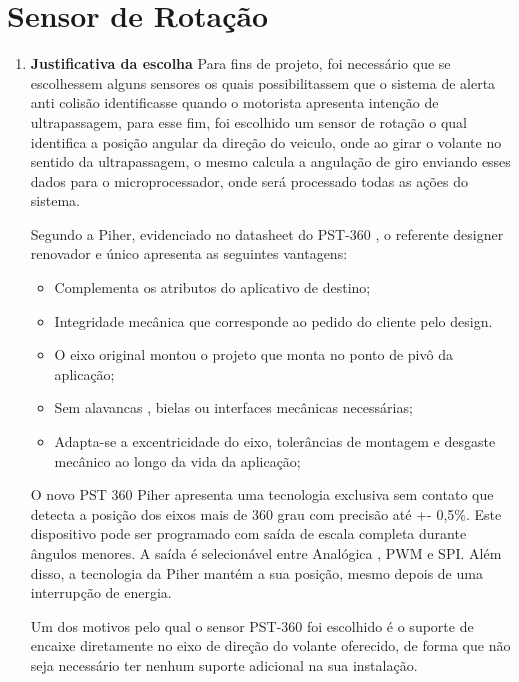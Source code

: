 \chapter[Sensor de Rotação]{Sensor de Rotação}

\begin{enumerate}
\item \textbf{Justificativa da escolha}
Para fins de projeto, foi necessário que se escolhessem alguns sensores os quais
possibilitassem que o sistema de alerta anti colisão identificasse quando o motorista
apresenta intenção de ultrapassagem, para esse fim, foi escolhido um sensor de rotação o
 qual identifica a posição angular da direção do veiculo, onde ao girar o volante no
 sentido da ultrapassagem, o mesmo calcula a angulação de giro enviando esses
 dados para o microprocessador, onde será processado todas as ações do sistema.

Segundo a Piher, evidenciado no datasheet do PST-360 \cite{sensor_rotacao}, o referente designer
renovador e único apresenta as seguintes vantagens:

\begin{itemize}
  \item Complementa os atributos do aplicativo de destino;
  \item Integridade mecânica que corresponde ao pedido do cliente pelo design.
  \item O eixo original montou o projeto que monta no ponto de pivô da aplicação;

  \item Sem alavancas , bielas ou interfaces mecânicas necessárias;

  \item Adapta-se a excentricidade do eixo, tolerâncias de montagem e
  desgaste mecânico ao longo da vida da aplicação;

\end{itemize}

O novo PST 360 Piher apresenta uma tecnologia exclusiva sem contato que detecta a posição dos
eixos mais de 360 grau com precisão até +- 0,5\%. Este dispositivo pode ser programado com
saída de escala completa durante ângulos menores. A saída é selecionável entre Analógica ,
PWM e SPI. Além disso, a tecnologia da Piher mantém a sua posição, mesmo depois de uma
interrupção de energia.

Um dos motivos pelo qual o sensor PST-360 foi escolhido é o suporte de encaixe diretamente no eixo de direção do volante oferecido, de forma que não seja necessário ter nenhum suporte adicional na sua instalação.


\end{enumerate}
